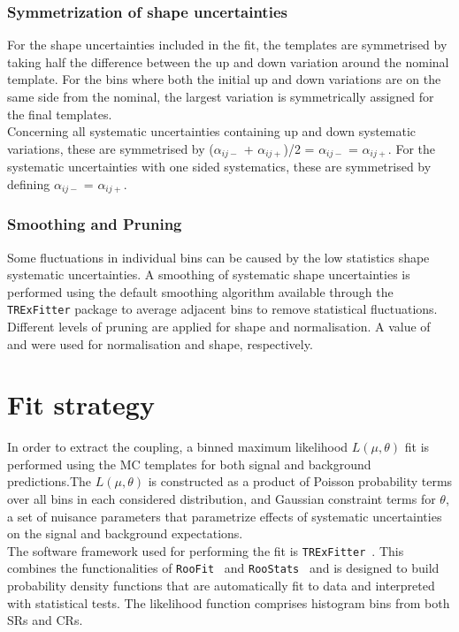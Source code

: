 \subsubsection{Symmetrization of shape uncertainties} 
For the shape uncertainties included in the fit, the templates are symmetrised by
taking half the difference between the up and down variation around
the nominal template. For the bins where both the initial up and down
variations are on the same side from the nominal, the largest
variation is symmetrically assigned for the final templates.\\
Concerning all systematic uncertainties containing up and down
systematic variations, these are symmetrised by 
($\alpha_{ij-}$ + $\alpha_{ij+}$)/2 = $\alpha_{ij-}$ = $\alpha_{ij+}$. 
For the systematic uncertainties with one sided systematics, these
are symmetrised by defining $\alpha_{ij-}$ = $\alpha_{ij+}$.\\
\subsubsection{Smoothing and Pruning} 
Some fluctuations in individual bins can be caused
by the low statistics shape systematic uncertainties. A smoothing of
systematic shape uncertainties is performed using the default
smoothing algorithm available through the \texttt{TRExFitter} package
to average adjacent bins to remove statistical fluctuations. \\
Different levels of pruning are applied for shape
and normalisation. A value of \prunenorm and \pruneshape were used for
normalisation and shape, respectively. 


\section {Fit strategy}
\label{sec:stat:strategy}

In order to extract the \tZc coupling, a binned maximum
likelihood $L(\mu,\theta)$ fit is performed using the MC templates for both signal and
background predictions.The $L(\mu,\theta)$ is constructed as a product of Poisson
probability terms over all bins in each considered distribution, and Gaussian constraint terms
for $\theta$, a set of nuisance parameters that parametrize effects of systematic uncertainties on the signal and background expectations.\\
The software framework used for performing the fit is \texttt{TRExFitter}~\cite{TRexfitter}.
This combines the functionalities of
\texttt{RooFit}~\cite{Verkerke:2003ir} and
\texttt{RooStats}~\cite{Moneta:2010pm} and is designed to build
probability density functions that are automatically fit to data and
interpreted with statistical tests.
The likelihood function comprises histogram bins from both SRs and
CRs.

